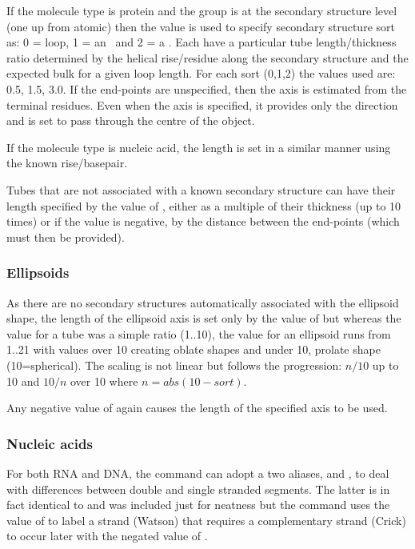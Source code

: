 If the molecule type is protein and the group is at the secondary structure level (one up 
from atomic) then the  value is used to specify secondary structure sort as:
0 = loop, 1 = an \AH\ and 2 = a \Bs.   Each have a particular tube length/thickness ratio
determined by the helical rise/residue along the secondary structure and the expected bulk
for a given loop length.  For each sort (0,1,2) the values used are: 0.5, 1.5, 3.0.
If the end-points are unspecified, then the axis is estimated from the terminal residues.
Even when the axis is specified, it provides only the direction and is set to pass through
the centre of the object.

If the molecule type is nucleic acid, the length is set in a similar manner using the
known rise/basepair.

Tubes that are not associated with a known secondary structure can have their length specified
by the value of , either as a multiple of their thickness (up to 10 times) or if
the value is negative, by the distance between the end-points (which must then be provided). 

\subsubsection{Ellipsoids}

As there are no secondary structures automatically associated with the ellipsoid shape, the
length of the ellipsoid axis is set only by the value of  but whereas the value for a
tube was a simple ratio (1..10), the value for an ellipsoid runs from 1..21 with values over
10 creating oblate shapes and under 10, prolate shape (10=spherical).  The scaling is not 
linear but follows the progression: $n/10$ up to 10 and $10/n$ over 10 where $n = abs(10-sort)$.

Any negative value of  again causes the length of the specified axis to be used. 

\subsubsection{Nucleic acids}

For both RNA and DNA, the  command can adopt a two aliases,  and ,
to deal with differences between double and single stranded segments.  The latter is in fact
identical to   and was included just for neatness but the  command uses
the value of   to label a strand (Watson) that requires a complementary strand (Crick)
to occur later with the negated value of .

